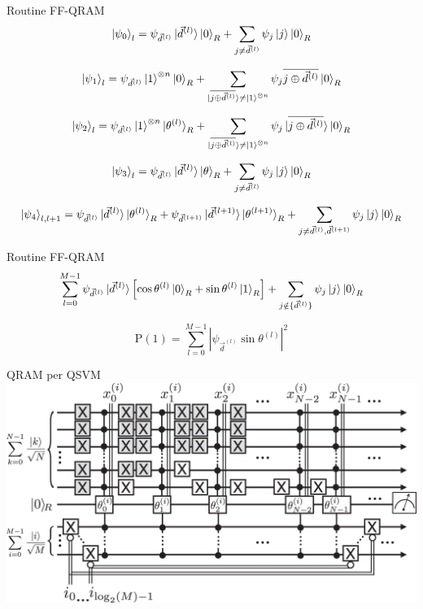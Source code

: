 \documentclass{beamer}
\begin{document}
    \begin{frame}{Routine FF-QRAM}
        \begin{equation*}
            \ket{\psi_0}_l = \psi_{\vec{d}^{(l)}} \ket{\vec{d}^{(l)}} \ket{0}_R + \sum_{j \neq \vec{d}^{(l)}} \psi_j \ket{j} \ket{0}_R
        \end{equation*}

        \begin{equation*}
            \ket{\psi_1}_l = \psi_{\vec{d}^{(l)}} \ket{1}^{\otimes n} \ket{0}_R + \sum_{\ket{\overline{j \oplus \vec{d}^{(l)}}} \neq \ket{1}^{\otimes n}} \psi_j \overline{j \oplus \vec{d}^{(l)}} \ket{0}_R
        \end{equation*}

        \begin{equation*}
            \ket{\psi_2}_l = \psi_{\vec{d}^{(l)}} \ket{1}^{\otimes n} \ket{\theta^{(l)}}_R + \sum_{\ket{\overline{j \oplus \vec{d}^{(l)}}} \neq \ket{1}^{\otimes n}} \psi_j \ket{\overline{j \oplus \vec{d}^{(l)}}} \ket{0}_R
        \end{equation*}
        
        \begin{equation*}
            \ket{\psi_3}_l = \psi_{\vec{d}^{(l)}} \ket{\vec{d}^{(l)}} \ket{\theta}_R + \sum_{j \neq \vec{d}^{(l)}} \psi_j \ket{j} \ket{0}_R
        \end{equation*}

        \begin{equation*}
            \ket{\psi_4}_{l,l+1} = \psi_{\vec{d}^{(l)}} \ket{\vec{d}^{(l)}} \ket{\theta^{(l)}}_R + \psi_{\vec{d}^{(l+1)}} \ket{\vec{d}^{(l+1)}} \ket{\theta^{(l+1)}}_R + \sum_{j \neq \vec{d}^{(l)},\vec{d}^{(l+1)}} \psi_j \ket{j} \ket{0}_R
        \end{equation*}
    \end{frame}

    \begin{frame}{Routine FF-QRAM}
        \begin{equation*}
            \sum_{l=0}^{M-1} \psi_{\vec{d}^{(l)}} \ket{\vec{d}^{(l)}} \left[ \cos\theta^{(l)} \ket{0}_R + \sin\theta^{(l)} \ket{1}_R \right] + \sum_{j \notin \{ \vec{d}^{(l)} \}} \psi_j \ket{j} \ket{0}_R
        \end{equation*}

        \begin{equation*}
            \text{P}(1) = \sum_{l=0}^{M-1} | \psi_{\vec{d}^{(l)}} \sin\theta^{(l)} |^2
        \end{equation*}
    \end{frame}

    \begin{frame}{QRAM per QSVM}
        \includegraphics[width=\linewidth]{gfx/qram_qsvm.png}
    \end{frame}
\end{document}
